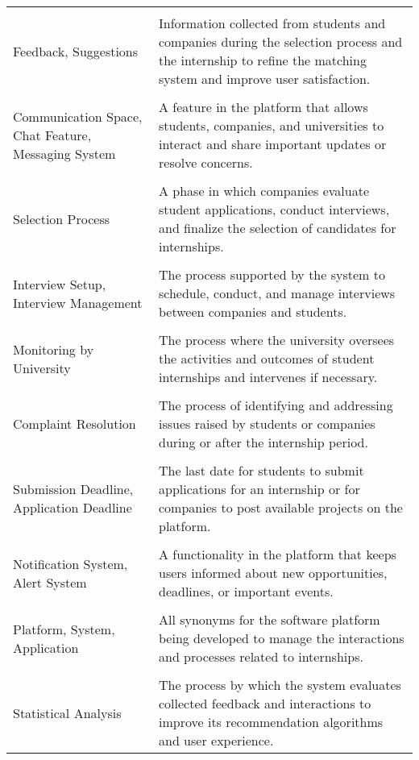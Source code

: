 \begin{longtable}{p{}p{}}
    \vspace{0.5em}\\
    Feedback, Suggestions & Information collected from students and companies
    during the selection process and the internship to refine the matching system and improve user satisfaction. \\
    \vspace{0.5em}\\
    Communication Space, Chat Feature, Messaging System & A feature in the platform that allows
    students, companies, and universities to interact and share important updates or resolve concerns. \\
    \vspace{0.5em}\\
    Selection Process & A phase in which companies evaluate student applications, conduct
    interviews, and finalize the selection of candidates for internships. \\
    \vspace{0.5em}\\
    Interview Setup, Interview Management & The process supported by the system to schedule,
    conduct, and manage interviews between companies and students. \\
    \vspace{0.5em}\\
    Monitoring by University & The process where the university oversees the activities and
    outcomes of student internships and intervenes if necessary. \\
    \vspace{0.5em}\\
    Complaint Resolution & The process of identifying and addressing issues raised by students
    or companies during or after the internship period. \\
    \vspace{0.5em}\\
    Submission Deadline, Application Deadline & The last date for students to submit applications
    for an internship or for companies to post available projects on the platform. \\
    \vspace{0.5em}\\
    Notification System, Alert System & A functionality in the platform that keeps users informed
    about new opportunities, deadlines, or important events. \\
    \vspace{0.5em}\\
    Platform, System, Application & All synonyms for the software platform being developed to
    manage the interactions and processes related to internships. \\
    \vspace{0.5em}\\
    Statistical Analysis & The process by which the system evaluates collected feedback and
    interactions to improve its recommendation algorithms and user experience. \\


\end{longtable}
